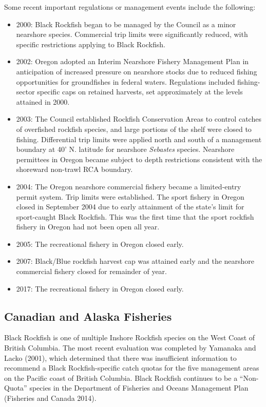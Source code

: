 \documentclass[11pt,
  english,
  letterpaper,
]{article}
\providecommand{\tightlist}{%
  \setlength{\itemsep}{0pt}\setlength{\parskip}{0pt}}
\providecommand{\tightlist}{%
  \setlength{\itemsep}{0pt}\setlength{\parskip}{0pt}}
\begin{document}
Some recent important regulations or management events include the following:

\begin{itemize}
\tightlist
\item
  2000: Black Rockfish began to be managed by the Council as a minor nearshore species. Commercial trip limits were significantly reduced, with specific restrictions applying to Black Rockfish.
\item
  2002: Oregon adopted an Interim Nearshore Fishery Management Plan in anticipation of increased pressure on nearshore stocks due to reduced fishing opportunities for groundfishes in federal waters. Regulations included fishing-sector specific caps on retained harvests, set approximately at the levels attained in 2000.
\item
  2003: The Council established Rockfish Conservation Areas to control catches of overfished rockfish species, and large portions of the shelf were closed to fishing. Differential trip limits were applied north and south of a management boundary at 40' N. latitude for nearshore \emph{Sebastes} species. Nearshore permittees in Oregon became subject to depth restrictions consistent with the shoreward non-trawl RCA boundary.
\item
  2004: The Oregon nearshore commercial fishery became a limited-entry permit system. Trip limits were established. The sport fishery in Oregon closed in September 2004 due to early attainment of the state's limit for sport-caught Black Rockfish. This was the first time that the sport rockfish fishery in Oregon had not been open all year.
\item
  2005: The recreational fishery in Oregon closed early.
\item
  2007: Black/Blue rockfish harvest cap was attained early and the nearshore commercial fishery closed for remainder of year.
\item
  2017: The recreational fishery in Oregon closed early.
\end{itemize}

\hypertarget{canadian-and-alaska-fisheries}{%
\subsection{Canadian and Alaska Fisheries}\label{canadian-and-alaska-fisheries}}

Black Rockfish is one of multiple Inshore Rockfish species on the West Coast of British Columbia. The most recent evaluation was completed by Yamanaka and Lacko (2001), which determined that there was insufficient information to recommend a Black Rockfish-specific catch quotas for the five management areas on the Pacific coast of British Columbia. Black Rockfish continues to be a ``Non-Quota'' species in the Department of Fisheries and Oceans Management Plan (Fisheries and Canada 2014).
\end{document}
